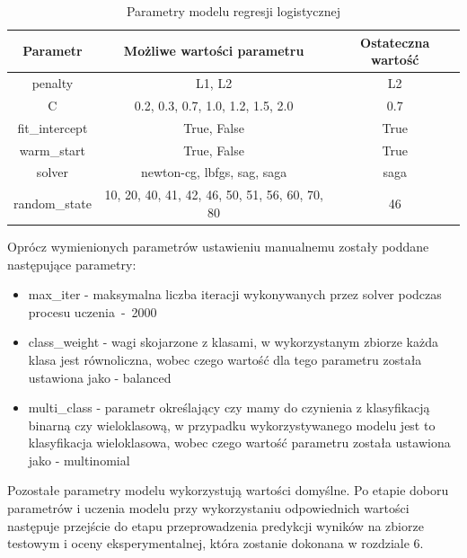         \begin{table}[H]
        \caption{Parametry modelu regresji logistycznej}
        \centering
        \begin{tabular}{c c c}
        \toprule
            Parametr & Możliwe wartości parametru & Ostateczna wartość \\
        \midrule
            penalty & L1, L2 & L2 \\
            C & 0.2, 0.3, 0.7, 1.0, 1.2, 1.5, 2.0 & 0.7 \\
            fit\_intercept & True, False & True \\
            warm\_start & True, False & True \\
            solver & newton-cg, lbfgs, sag, saga & saga\\
            random\_state & 10, 20, 40, 41, 42, 46, 50, 51, 56, 60, 70, 80 & 46 \\
        \bottomrule
        \end{tabular}
        \end{table}
        Oprócz wymienionych parametrów ustawieniu manualnemu zostały poddane następujące parametry:
        \begin{itemize}
            \item max\_iter - maksymalna liczba iteracji wykonywanych przez solver podczas procesu \mbox{uczenia -  2000}
            \item class\_weight - wagi skojarzone z klasami, w wykorzystanym zbiorze każda klasa jest równoliczna, wobec czego wartość dla tego parametru została ustawiona jako - balanced
            \item multi\_class - parametr określający czy mamy do czynienia z klasyfikacją binarną czy wieloklasową, w przypadku wykorzystywanego modelu jest to klasyfikacja wieloklasowa, wobec czego wartość parametru została ustawiona jako - multinomial
        \end{itemize}
        Pozostałe parametry modelu wykorzystują wartości domyślne. Po etapie doboru parametrów i uczenia modelu przy wykorzystaniu odpowiednich wartości następuje przejście do etapu przeprowadzenia predykcji wyników na zbiorze testowym i oceny eksperymentalnej, która zostanie dokonana w rozdziale 6.
        
